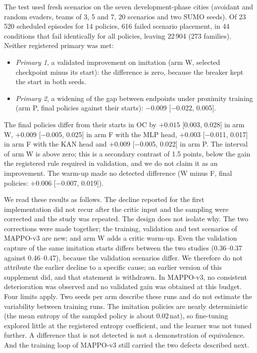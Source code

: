 \documentclass[preprint,12pt]{elsarticle}
\begin{document}
The test used fresh scenarios on the seven development-phase cities (avoidant and random evaders, teams of 3, 5 and
7, 20 scenarios and two SUMO seeds). Of 23\,520 scheduled episodes for 14 policies, 616 failed scenario placement, in
44 conditions that fail identically for all policies, leaving 22\,904 (273 families). Neither registered primary was met:
\begin{itemize}
\item \emph{Primary 1}, a validated improvement on imitation (arm W, selected checkpoint minus its start): the
difference is zero, because the breaker kept the start in both seeds.
\item \emph{Primary 2}, a widening of the gap between endpoints under proximity training (arm P, final policies
against their starts): $-0.009$ [$-$0.022, 0.005].
\end{itemize}
The final policies differ from their starts in OC by $+0.015$ [0.003, 0.028] in arm W, $+0.009$ [$-$0.005, 0.025] in
arm F with the MLP head, $+0.003$ [$-$0.011, 0.017] in arm F with the KAN head and $+0.009$ [$-$0.005, 0.022] in arm
P. The interval of arm W is above zero; this is a secondary contrast of 1.5 points, below the gain the registered
rule required in validation, and we do not claim it as an improvement. The warm-up made no detected difference (W
minus F, final policies: $+0.006$ [$-$0.007, 0.019]).

We read these results as follows. The decline reported for the first implementation did not recur after the critic
input and the sampling were corrected and the study was repeated. The design does not isolate why. The two
corrections were made together; the training, validation and test scenarios of MAPPO-v3 are new; and arm W adds a
critic warm-up. Even the validation capture of the same imitation starts differs between the two studies (0.36--0.37
against 0.46--0.47), because the validation scenarios differ. We therefore do not attribute the earlier decline to a
specific cause; an earlier version of this supplement did, and that statement is withdrawn. In MAPPO-v3,
no consistent deterioration was observed and no validated gain was obtained at this budget. Four limits apply. Two seeds per
arm describe these runs and do not estimate the variability between training runs. The imitation policies are nearly
deterministic (the mean entropy of the sampled policy is about 0.02\,nat), so fine-tuning explored little at the
registered entropy coefficient, and the learner was not tuned further. A difference that is not detected is not a
demonstration of equivalence. And the training loop of MAPPO-v3 still carried the two defects described next.
\end{document}

